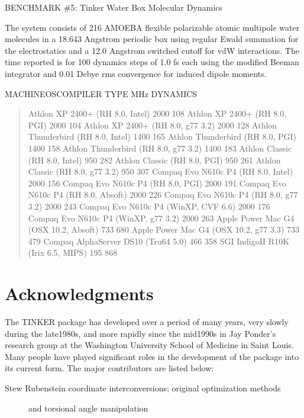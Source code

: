 \documentclass[letterpaper,11pt,english]{sphinxmanual}
\begin{document}
BENCHMARK \#5:  Tinker Water Box Molecular Dynamics

The system consists of 216 AMOEBA flexible polarizable atomic multipole water molecules in a 18.643 Angstrom periodic box using regular Ewald summation for the electrostatics and a 12.0 Angstrom switched cutoff for vdW interactions. The time reported is for 100 dynamics steps of 1.0 fs each using the modified Beeman integrator and 0.01 Debye rms convergence for induced dipole moments.

MACHINE\sphinxhyphen{}OS\sphinxhyphen{}COMPILER TYPE        MHz     DYNAMICS
\begin{quote}

Athlon XP 2400+ (RH 8.0, Intel)        2000    108
Athlon XP 2400+ (RH 8.0, PGI)  2000    104
Athlon XP 2400+ (RH 8.0, g77 3.2)      2000    128
Athlon Thunderbird (RH 8.0, Intel)     1400    165
Athlon Thunderbird (RH 8.0, PGI)       1400    158
Athlon Thunderbird (RH 8.0, g77 3.2)   1400    183
Athlon Classic (RH 8.0, Intel) 950     282
Athlon Classic (RH 8.0, PGI)   950     261
Athlon Classic (RH 8.0, g77 3.2)       950     307
Compaq Evo N610c P4 (RH 8.0, Intel)    2000    156
Compaq Evo N610c P4 (RH 8.0, PGI)      2000    191
Compaq Evo N610c P4 (RH 8.0, Absoft)   2000    226
Compaq Evo N610c P4 (RH 8.0, g77 3.2)  2000    243
Compaq Evo N610c P4 (WinXP, CVF 6.6)   2000    176
Compaq Evo N610c P4 (WinXP, g77 3.2)   2000    263
Apple Power Mac G4 (OSX 10.2, Absoft)  733     680
Apple Power Mac G4 (OSX 10.2, g77 3.3) 733     479
Compaq AlphaServer DS10 (Tru64 5.0)    466     358
SGI IndigoII R10K (Irix 6.5, MIPS)     195     868
\end{quote}


\chapter{Acknowledgments}
\label{\detokenize{text/acknowledgements:acknowledgments}}\label{\detokenize{text/acknowledgements::doc}}
The TINKER package has developed over a period of many years, very slowly during the late\sphinxhyphen{}1980s, and more rapidly since the mid\sphinxhyphen{}1990s in Jay Ponder’s research group at the Washington University School of Medicine in Saint Louis. Many people have played significant roles in the development of the package into its current form. The major contributors are listed below:
\begin{description}
\item[{Stew Rubenstein coordinate interconversions; original optimization methods}] \leavevmode
and torsional angle manipulation

\end{description}
\end{document}
